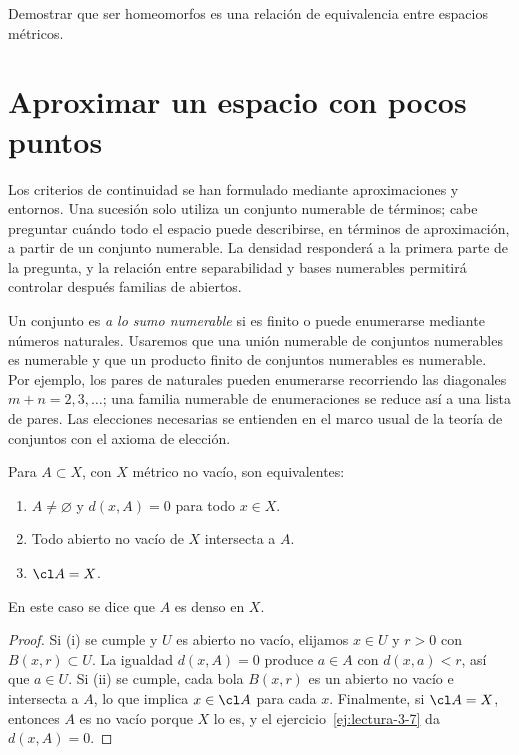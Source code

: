 \begin{ejercicio}\label{ej:lectura-5-9}
Demostrar que ser homeomorfos es una relación de equivalencia entre espacios métricos.
\end{ejercicio}


\section{Aproximar un espacio con pocos puntos}\label{lectura:06}
Los criterios de continuidad se han formulado mediante aproximaciones y entornos. Una sucesión solo utiliza un conjunto numerable de términos; cabe preguntar cuándo todo el espacio puede describirse, en términos de aproximación, a partir de un conjunto numerable. La densidad responderá a la primera parte de la pregunta, y la relación entre separabilidad y bases numerables permitirá controlar después familias de abiertos.

Un conjunto es \emph{a lo sumo numerable} si es finito o puede enumerarse mediante números naturales. Usaremos que una unión numerable de conjuntos numerables es numerable y que un producto finito de conjuntos numerables es numerable. Por ejemplo, los pares de naturales pueden enumerarse recorriendo las diagonales $m+n=2,3,\ldots$; una familia numerable de enumeraciones se reduce así a una lista de pares. Las elecciones necesarias se entienden en el marco usual de la teoría de conjuntos con el axioma de elección.

\begin{teorema}\label{ch06:denso}
Para $A\subset X$, con $X$ métrico no vacío, son equivalentes:
\begin{enumerate}[label=(\roman*)]
\item $A\ne\varnothing$ y $d(x,A)=0$ para todo $x\in X$.
\item Todo abierto no vacío de $X$ intersecta a $A$.
\item $\cl A=X$.
\end{enumerate}
En este caso se dice que $A$ es denso en $X$.
\end{teorema}
\begin{proof}
Si (i) se cumple y $U$ es abierto no vacío, elijamos $x\in U$ y $r>0$ con $B(x,r)\subset U$. La igualdad $d(x,A)=0$ produce $a\in A$ con $d(x,a)<r$, así que $a\in U$. Si (ii) se cumple, cada bola $B(x,r)$ es un abierto no vacío e intersecta a $A$, lo que implica $x\in\cl A$ para cada $x$. Finalmente, si $\cl A=X$, entonces $A$ es no vacío porque $X$ lo es, y el ejercicio~\ref{ej:lectura-3-7} da $d(x,A)=0$.
\end{proof}

